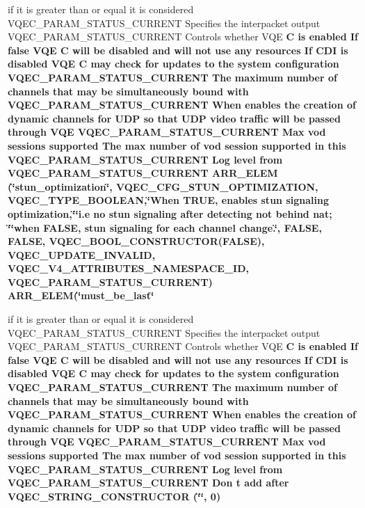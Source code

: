 \begin{CompactItemize}
\item 
if it is greater than or equal it is considered VQEC\_\-PARAM\_\-STATUS\_\-CURRENT Specifies the interpacket output VQEC\_\-PARAM\_\-STATUS\_\-CURRENT Controls whether VQE \bf{C} is enabled If false VQE \bf{C} will be disabled and will not use any resources If CDI is disabled VQE \bf{C} may check for updates \bf{to} the system configuration VQEC\_\-PARAM\_\-STATUS\_\-CURRENT The maximum number of \bf{channels} that may be simultaneously bound with VQEC\_\-PARAM\_\-STATUS\_\-CURRENT When enables the creation of dynamic \bf{channels} for UDP so that UDP video traffic will be passed through VQE VQEC\_\-PARAM\_\-STATUS\_\-CURRENT Max vod sessions supported The max number of vod session supported in \bf{this} VQEC\_\-PARAM\_\-STATUS\_\-CURRENT Log level from VQEC\_\-PARAM\_\-STATUS\_\-CURRENT \bf{ARR\_\-ELEM} (\char`\"{}stun\_\-optimization\char`\"{}, VQEC\_\-CFG\_\-STUN\_\-OPTIMIZATION, \bf{VQEC\_\-TYPE\_\-BOOLEAN},\char`\"{}When \bf{TRUE}, enables stun signaling optimization,\char`\"{}\char`\"{}i.e no stun signaling after detecting not behind nat; \char`\"{}\char`\"{}when \bf{FALSE}, stun signaling for each channel change.\char`\"{}, FALSE, \bf{FALSE}, VQEC\_\-BOOL\_\-CONSTRUCTOR(\bf{FALSE}), \bf{VQEC\_\-UPDATE\_\-INVALID}, \bf{VQEC\_\-V4\_\-ATTRIBUTES\_\-NAMESPACE\_\-ID}, VQEC\_\-PARAM\_\-STATUS\_\-CURRENT) ARR\_\-ELEM(\char`\"{}must\_\-be\_\-last\char`\"{}
\item 
if it is greater than or equal it is considered VQEC\_\-PARAM\_\-STATUS\_\-CURRENT Specifies the interpacket output VQEC\_\-PARAM\_\-STATUS\_\-CURRENT Controls whether VQE \bf{C} is enabled If false VQE \bf{C} will be disabled and will not use any resources If CDI is disabled VQE \bf{C} may check for updates \bf{to} the system configuration VQEC\_\-PARAM\_\-STATUS\_\-CURRENT The maximum number of \bf{channels} that may be simultaneously bound with VQEC\_\-PARAM\_\-STATUS\_\-CURRENT When enables the creation of dynamic \bf{channels} for UDP so that UDP video traffic will be passed through VQE VQEC\_\-PARAM\_\-STATUS\_\-CURRENT Max vod sessions supported The max number of vod session supported in \bf{this} VQEC\_\-PARAM\_\-STATUS\_\-CURRENT Log level from VQEC\_\-PARAM\_\-STATUS\_\-CURRENT Don t add after \bf{VQEC\_\-STRING\_\-CONSTRUCTOR} (\char`\"{}\char`\"{}, 0)
\end{CompactItemize}
